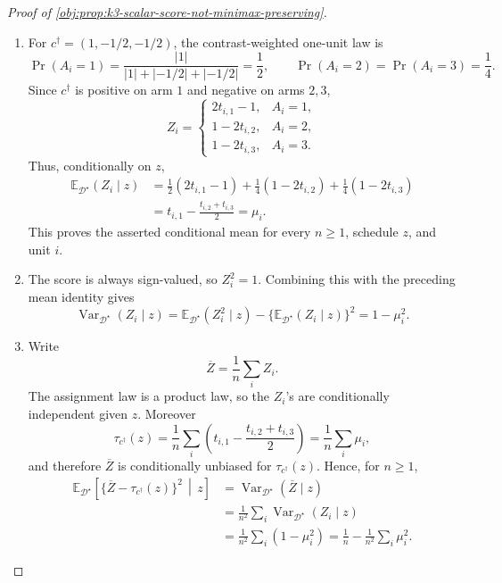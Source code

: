 \documentclass[11pt]{article}
\begin{document}
\begin{proof}[Proof of \cref{obj:prop:k3-scalar-score-not-minimax-preserving}]
\begin{enumerate}
\item
For \(c^\dagger=(1,-1/2,-1/2)\), the contrast-weighted one-unit law is
\[
\Pr(A_i=1)=\frac{|1|}{|1|+|-1/2|+|-1/2|}=\frac12,
\qquad
\Pr(A_i=2)=\Pr(A_i=3)=\frac14 .
\]
Since \(c^\dagger\) is positive on arm \(1\) and negative on arms \(2,3\),
\[
Z_i=
\begin{cases}
 2t_{i,1}-1, & A_i=1,\\
 1-2t_{i,2}, & A_i=2,\\
 1-2t_{i,3}, & A_i=3.
\end{cases}
\]
Thus, conditionally on \(z\),
\[
\begin{aligned}
\mathbb E_{\mathcal D^\star}(Z_i\mid z)
&=\frac12(2t_{i,1}-1)+\frac14(1-2t_{i,2})
  +\frac14(1-2t_{i,3})  \\
&=t_{i,1}-\frac{t_{i,2}+t_{i,3}}2
=\mu_i .
\end{aligned}
\]
This proves the asserted conditional mean for every \(n\ge1\), schedule \(z\), and unit \(i\). %

\item
The score is always sign-valued, so \(Z_i^2=1\). Combining this with the preceding mean identity gives
\[
\operatorname{Var}_{\mathcal D^\star}(Z_i\mid z)
=\mathbb E_{\mathcal D^\star}(Z_i^2\mid z)
-\{\mathbb E_{\mathcal D^\star}(Z_i\mid z)\}^2
=1-\mu_i^2 .
\]

\item
Write
\[
\overline Z=\frac1n\sum_i Z_i .
\]
The assignment law is a product law, so the \(Z_i\)'s are conditionally independent given \(z\). Moreover
\[
\tau_{c^\dagger}(z)
=\frac1n\sum_i\left(t_{i,1}-\frac{t_{i,2}+t_{i,3}}2\right)
=\frac1n\sum_i\mu_i ,
\]
and therefore \(\overline Z\) is conditionally unbiased for \(\tau_{c^\dagger}(z)\). Hence, for \(n\ge1\),
\[
\begin{aligned}
\mathbb E_{\mathcal D^\star}\!\left[
\{\overline Z-\tau_{c^\dagger}(z)\}^2\,\middle|\,z\right]
&=\operatorname{Var}_{\mathcal D^\star}(\overline Z\mid z)  \\
&=\frac1{n^2}\sum_i \operatorname{Var}_{\mathcal D^\star}(Z_i\mid z)\\
&=\frac1{n^2}\sum_i(1-\mu_i^2)
=\frac1n-\frac1{n^2}\sum_i\mu_i^2 .
\end{aligned}
\]


\end{enumerate}
\end{proof}
\end{document}
